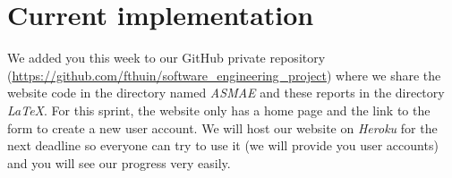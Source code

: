 
\section{Current implementation}

We added you this week to our GitHub private repository
(\url{https://github.com/fthuin/software_engineering_project}) where we
share the website code in the directory named \textit{ASMAE} and these reports in the
directory \textit{LaTeX}. For this sprint, the website only has a home page
and the link to the form to create a new user account. We will host
our website on \textit{Heroku} for the next deadline so everyone can try to
use it (we will provide you user accounts) and you will see our progress
very easily.
